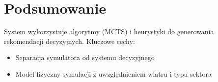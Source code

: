 \documentclass[11pt,a4paper]{article}
\begin{document}
\section{Podsumowanie}

System wykorzystuje algorytmy (MCTS) i heurystyki do generowania rekomendacji decyzyjnych. Kluczowe cechy:

\begin{itemize}
    \item Separacja symulatora od systemu decyzyjnego
    \item Model fizyczny symulacji z uwzględnieniem wiatru i typu sektora
\end{itemize}
\end{document}
